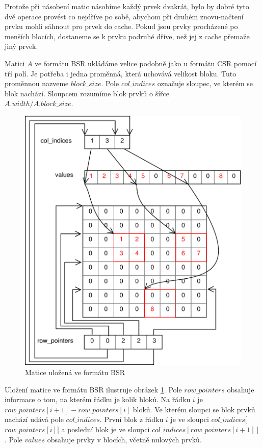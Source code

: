 Protože při násobení matic násobíme každý prvek dvakrát, bylo by dobré tyto dvě operace provést co nejdříve po sobě, abychom při druhém znovu-načtení prvku mohli sáhnout pro prvek do cache. Pokud jsou prvky procházené po menších blocích, dostaneme se k prvku podruhé dříve, než jej z cache přemaže jiný prvek.

Matici $A$ ve formátu BSR ukládáme velice podobně jako u formátu CSR pomocí tří polí. Je potřeba i jedna proměnná, která uchovává velikost bloku. Tuto proměnnou nazveme $block\_size$. Pole $col\_indices$ označuje sloupec, ve kterém se blok nachází. Sloupcem rozumíme blok prvků o šířce \\ $A.width / A.block\_size$.

\begin{figure}[htb]\centering
	\includegraphics[width=\textwidth]{./images/bsr/bsr}
	\caption{Matice uložená ve formátu BSR}
	\label{fig:BSR}
\end{figure}

Uložení matice ve formátu BSR ilustruje obrázek \ref{fig:BSR}. Pole $row\_pointers$ obsahuje informace o tom, na kterém řádku je kolik bloků. Na řádku $i$ je $row\_pointers[i+1] - row\_pointers[i]$ bloků. Ve kterém sloupci se blok prvků nachází udává pole $col\_indices$. První blok z řádku $i$ je ve sloupci $col\_indices[$ $row\_pointers[i]]$ a poslední blok je ve sloupci $col\_indices[ row\_pointers[i+1] ]$. Pole $values$ obsahuje prvky v blocích, včetně nulových prvků.

